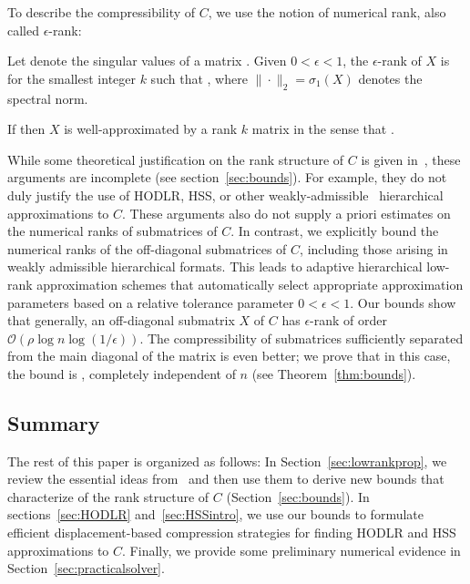 \documentclass[final,reqno,onefignum,onetabnum]{siamart190516}
\newcommand{\erank}{{\rm rank}_\epsilon}
\begin{document}
To describe the compressibility of $C$, we use the notion of numerical rank, also called $\epsilon$-rank:
\begin{definition} 
\label{def:erank}
Let  denote the singular values of a matrix . Given $0< \epsilon < 1$, the $\epsilon$-rank of $X$  is  \smash{$\erank(X) =k$} for the smallest integer $k$ such that ,
where $\| \cdot \|_2 = \sigma_1(X)$ denotes the spectral norm. 
\end{definition}
If  \smash{$\erank(X) \leq k$} then $X$ is well-approximated by a rank $k$ matrix  in the sense that . 

While some theoretical justification on the rank structure of $C$ is given in~\cite{chandrasekaran2007superfast, martinsson2011fast}, these arguments are incomplete (see section~\ref{sec:bounds}). For example, they do not duly justify the use of HODLR, HSS, or other weakly-admissible~\cite{hackbusch2004hierarchical} hierarchical approximations to $C$.  These arguments also do not supply a priori estimates on the numerical ranks of submatrices of $C$. In contrast, we explicitly bound the numerical ranks of the off-diagonal submatrices of $C$, including those arising in weakly admissible hierarchical formats. This leads to adaptive hierarchical low-rank approximation schemes that automatically select appropriate approximation parameters based on a relative tolerance parameter $0 < \epsilon < 1$.
Our bounds show that generally, an off-diagonal submatrix $X$ of $C$ has $\epsilon$-rank of order $\mathcal{O}(\rho  \log n \log (1/\epsilon) )$.  The compressibility of submatrices sufficiently separated from the main diagonal of the matrix is even better; %
we prove that in this case, the bound is , completely independent of $n$ (see Theorem~\ref{thm:bounds}). 

 

\subsection{Summary} The rest of this paper is organized as follows: 
In Section~\ref{sec:lowrankprop}, we review the essential ideas from~\cite{Beckermann2019} and then use them to derive new bounds that characterize of the rank structure of $C$ (Section~\ref{sec:bounds}). 
In sections~\ref{sec:HODLR} and~\ref{sec:HSSintro}, we use our bounds to formulate efficient displacement-based compression strategies for finding HODLR and HSS approximations to $C$. Finally, we provide some
preliminary numerical evidence in Section~\ref{sec:practicalsolver}. 
\end{document}
